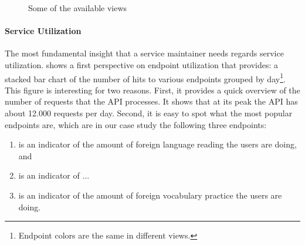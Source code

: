 \documentclass[conference]{IEEEtran}
\begin{document}
\begin{figure}[t]
    
	\caption{Some of the available views\label{fig:views}}
\end{figure}

     



\paragraph{Service Utilization}
\label{sec:util}

The most fundamental insight that a service maintainer needs regards service utilization. 
 shows a first perspective on endpoint utilization that \tool provides: a stacked bar chart of the number of hits to various endpoints grouped by day\footnote{Endpoint colors are the same in different views.}. This figure is interesting for two reasons. First, it provides a quick overview of the number of requests that the API processes. It shows that at its peak the API has about 12.000 requests per day. Second, it is easy to spot what the most popular endpoints are, which are in our case study the following three endpoints:

\begin{enumerate}
	
	\item \textbf{\color{myred} \epTranslations} is an indicator of the amount of foreign language reading the users are doing, and 
	
	\item \textbf{\color{myblue} \epLearnedLanguage} is an indicator of ... %
	
	\item \textbf{\color{mygreen} \epOutcome} is an indicator of the amount of foreign vocabulary practice the users are doing.
	
\end{enumerate}
\end{document}
